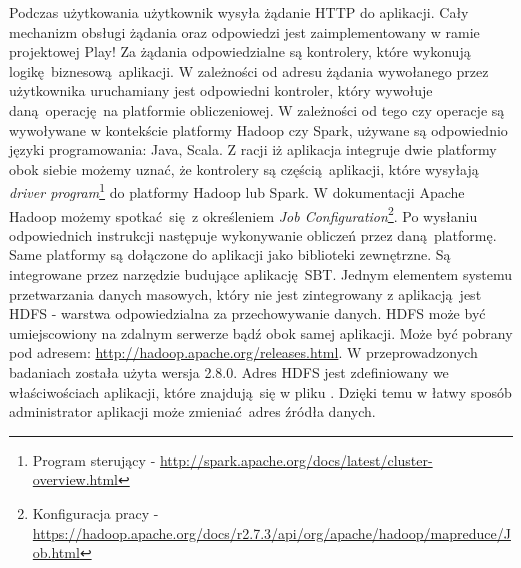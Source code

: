 \newline Podczas użytkowania użytkownik wysyła żądanie HTTP do aplikacji. Cały mechanizm obsługi żądania oraz odpowiedzi jest zaimplementowany w ramie projektowej Play! Za żądania odpowiedzialne są kontrolery, które wykonują logikę biznesową aplikacji. W zależności od adresu żądania wywołanego przez użytkownika uruchamiany jest odpowiedni kontroler, który wywołuje daną operację na platformie obliczeniowej. W zależności od tego czy operacje są wywoływane w kontekście platformy Hadoop czy Spark, używane są odpowiednio języki programowania: Java, Scala. Z racji iż aplikacja integruje dwie platformy obok siebie możemy uznać, że kontrolery są częścią aplikacji, które wysyłają \textit{driver program}\footnote{Program sterujący - \url{http://spark.apache.org/docs/latest/cluster-overview.html}} do platformy Hadoop lub Spark. W dokumentacji Apache Hadoop możemy spotkać się z określeniem \textit{Job Configuration}\footnote{Konfiguracja pracy - \url{https://hadoop.apache.org/docs/r2.7.3/api/org/apache/hadoop/mapreduce/Job.html}}. Po wysłaniu odpowiednich instrukcji następuje wykonywanie obliczeń przez daną platformę. Same platformy są dołączone do aplikacji jako biblioteki zewnętrzne. Są integrowane przez narzędzie budujące aplikację SBT. Jednym elementem systemu przetwarzania danych masowych, który nie jest zintegrowany z aplikacją jest HDFS - warstwa odpowiedzialna za przechowywanie danych. HDFS może być umiejscowiony na zdalnym serwerze bądź obok samej aplikacji. Może być pobrany pod adresem: \url{http://hadoop.apache.org/releases.html}. W przeprowadzonych badaniach została użyta wersja 2.8.0. Adres HDFS jest zdefiniowany we właściwościach aplikacji, które znajdują się w pliku . Dzięki temu w łatwy sposób administrator aplikacji może zmieniać adres źródła danych.
